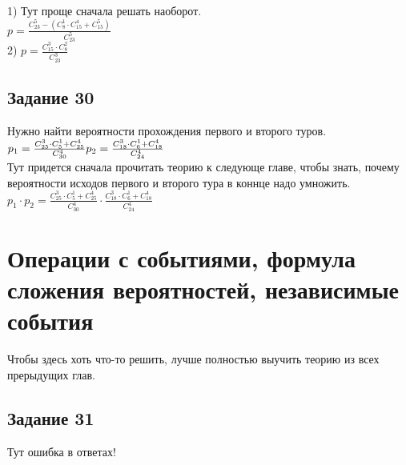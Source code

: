 \documentclass[12pt]{article}
\begin{document}
1)
Тут проще сначала решать наоборот.\\
$
p=\frac{C_{23}^5-(C_{8}^1\cdot C_{15}^4+C_{15}^5)}{C_{23}^5}
$\\
2)
$
p=\frac{C_{15}^3 \cdot C_{8}^2}{C_{23}^3}
$

\newpage
\subsection{Задание 30}
Нужно найти вероятности прохождения первого и второго туров.\\
$
p_1=\frac{C_{25}^3\cdot C_{5}^1+C_{25}^4}{C_{30}^4}\\
p_2=\frac{C_{18}^3\cdot C_{6}^1+C_{18}^4}{C_{24}^4}
$\\
Тут придется сначала прочитать теорию к следующе главе, чтобы знать, почему вероятности исходов первого и второго тура в коннце надо умножить.\\
$
p_1\cdot p_2=\frac{C_{25}^3\cdot C_{5}^1+C_{25}^4}{C_{30}^4}\cdot \frac{C_{18}^3\cdot C_{6}^1+C_{18}^4}{C_{24}^4}
$

\newpage
\section{Операции с событиями, формула сложения вероятностей, независимые события}

Чтобы здесь хоть что-то решить, лучше полностью выучить теорию из всех прерыдущих глав.
\newpage
\subsection{Задание 31}

Тут ошибка в ответах!
\end{document}
